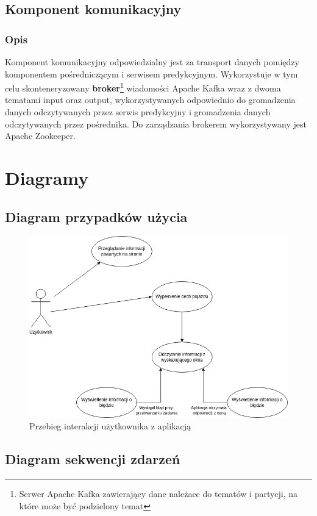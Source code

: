 \documentclass[12pt, a4paper]{report}
\begin{document}
\section{Komponent komunikacyjny}
\subsection{Opis}
Komponent komunikacyjny odpowiedzialny jest za transport danych pomiędzy komponentem pośredniczącym i serwisem predykcyjnym.
Wykorzystuje w tym celu skonteneryzowany \textbf{broker}\footnote{Serwer Apache Kafka zawierający dane należace do tematów i partycji, na które może być podzielony temat}
wiadomości Apache Kafka wraz z dwoma tematami input oraz output, wykorzystywanych
odpowiednio do gromadzenia danych odczytywanych przez serwis predykcyjny i gromadzenia danych odczytywanych przez pośrednika.
Do zarządzania brokerem wykorzystywany jest Apache Zookeeper.

\chapter{Diagramy}
\section{Diagram przypadków użycia}
\begin{figure}[H]
    \centering
    \includegraphics[width=1\textwidth]{diagrams/use_case_diagram.png}
    \caption{Przebieg interakcji użytkownika z aplikacją}
\end{figure}
\section{Diagram sekwencji zdarzeń}
\end{document}
